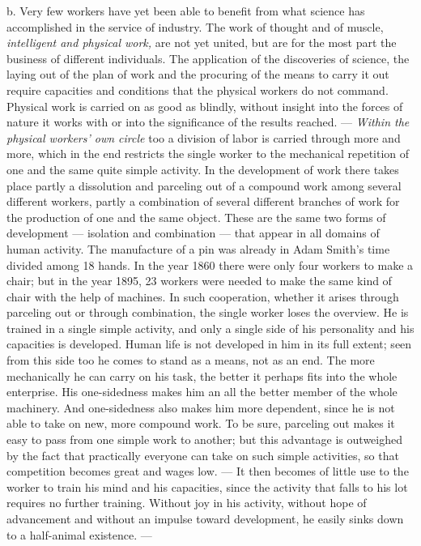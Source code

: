 \documentclass[12pt,a4paper,openany]{book}
\newcommand{\opage}[1]{\marginnote{\footnotesize\textit{[#1]}}}
\begin{document}
b. Very few workers have yet been able to benefit from what science has accomplished in the service of industry. The work
of thought and of muscle, \textit{intelligent and physical work,} are not yet united, but are for the most part the
business of different individuals. The application of the discoveries of science, the laying out of the plan of work and
the procuring of the means to
\opage{363}carry it out require capacities and conditions that the physical workers do not command. Physical work is
carried on as good as blindly, without insight into the forces of nature it works with or into the significance of the
results reached. --- \textit{Within the physical workers' own circle} too a division of labor is carried through more and
more, which in the end restricts the single worker to the mechanical repetition of one and the same quite simple activity.
In the development of work there takes place partly a dissolution and parceling out of a compound work among several
different workers, partly a combination of several different branches of work for the production of one and the same
object. These are the same two forms of development --- isolation and combination --- that appear in all domains of human
activity. The manufacture of a pin was already in Adam Smith's time divided among 18 hands. In the year 1860 there were
only four workers to make a chair; but in the year 1895, 23 workers were needed to make the same kind of chair with the
help of machines. In such cooperation, whether it arises through parceling out or through combination, the single worker
loses the overview. He is trained in a single simple activity, and only a single side of his personality and his
capacities is developed. Human life is not developed in him in its full extent; seen from this side too he comes to stand
as a means, not as an end. The more mechanically he can carry on his task, the better it perhaps fits into the whole
enterprise. His one-sidedness makes him an all the better member of the whole machinery. And one-sidedness also makes him
more dependent, since he is not able to take on new, more compound work. To be sure, parceling out makes it easy to pass
from one simple work to another; but this advantage is outweighed by the fact that practically everyone can take on such
simple activities, so that competition becomes great and wages low. --- It then becomes of little use to the worker to
train his mind and his capacities, since the activity that falls to his lot requires no further training. Without joy in
his activity, without hope
\opage{364}of advancement and without an impulse toward development, he easily sinks down to a half-animal existence.
---
\end{document}
